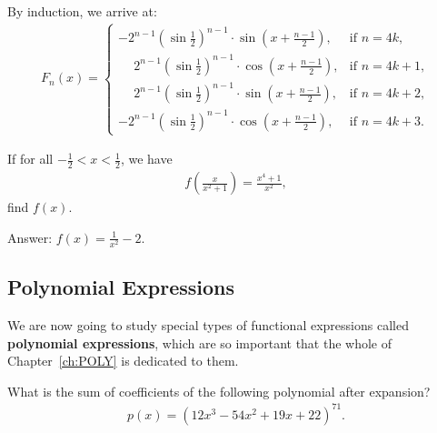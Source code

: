 \begin{solution}[name=Solution by Parviz Shahriari]
By induction, we arrive at:
\begin{align*}
    F_n(x) = \begin{cases}
        -2^{n-1}\left(\sin \frac{1}{2}\right)^{n-1} \cdot \sin\left(x+ \frac{n-1}{2}\right), & \mbox{if } n=4k,\\
        \phantom{+}2^{n-1}\left(\sin \frac{1}{2}\right)^{n-1}\cdot \cos\left(x+ \frac{n-1}{2}\right), & \mbox{if } n=4k+1,\\
        \phantom{+}2^{n-1}\left(\sin \frac{1}{2}\right)^{n-1}\cdot \sin\left(x+ \frac{n-1}{2}\right), & \mbox{if } n=4k+2,\\
        -2^{n-1}\left(\sin \frac{1}{2}\right)^{n-1}\cdot \cos\left(x+ \frac{n-1}{2}\right), & \mbox{if } n=4k+3.
    \end{cases}
\end{align*}
\end{solution}



\begin{tcolorbox}
\begin{question}
If for all $-\frac{1}{2} < x < \frac{1}{2}$, we have
\begin{align*}
    f\left(\frac{x}{x^2+1}\right) = \frac{x^4+1}{x^2},
\end{align*}
find $f(x)$.
\end{question}
\end{tcolorbox}

\begin{solution}[name=Solution by Parviz Shahriari]
Answer: $f(x) = \frac{1}{x^2}-2$.
\end{solution}

\subsection{Polynomial Expressions}
We are now going to study special types of functional expressions called \textbf{polynomial expressions}, which are so important that the whole of Chapter~\ref{ch:POLY} is dedicated to them.

\begin{tcolorbox}
\begin{question}
What is the sum of coefficients of the following polynomial after expansion?
\begin{align*}
    p(x)=(12x^3-54x^2+19x+22)^{71}.
\end{align*}
\end{question}
\end{tcolorbox}

